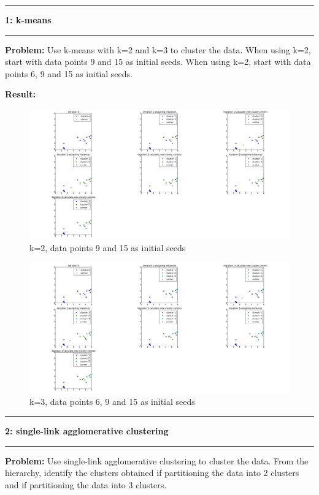 \documentclass[11pt]{article}
\newcommand\question[2]{\vspace{.25in}\hrule\textbf{#1: #2}\vspace{.5em}\hrule\vspace{.10in}}
\newcommand\problem{\vspace{.10in}\textbf{Problem: }}
\newcommand\result{\vspace{.10in}\textbf{Result: }}
\begin{document}
\raggedright

\justify
\question{1}{k-means}

\problem Use k-means with k=2 and k=3 to cluster the data. When using k=2, start with data points 9 and 15 as initial seeds. When using k=2, start with data points 6, 9 and 15 as initial seeds.

\result
\begin{figure}[h]
\centering
\includegraphics[width=\textwidth]{k2.pdf}
\caption{k=2, data points 9 and 15 as initial seeds}
\label{convergence1}
\end{figure}

\begin{figure}[h]
\centering
\includegraphics[width=\textwidth]{k3.pdf}
\caption{k=3, data points 6, 9 and 15 as initial seeds}
\label{convergence1}
\end{figure}
\clearpage
\question{2}{single-link agglomerative clustering}

\problem Use single-link agglomerative clustering to cluster the data. From the hierarchy, identify the clusters obtained if partitioning the data into 2 clusters and if partitioning the data into 3 clusters.
\end{document}
